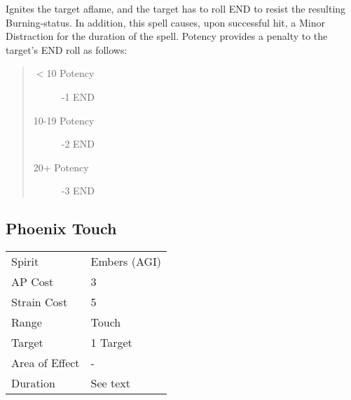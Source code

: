 \documentclass[11pt,a4paper,twocolumn]{book}
\begin{document}
Ignites the target aflame, and the target has to roll END to resist the resulting Burning-status. In addition, this spell causes, upon successful hit, a Minor Distraction for the duration of the spell. Potency provides a penalty to the target's END roll as follows:
\begin{quote}
	\begin{description}
		\item[$<$10 Potency] 	-1 END
		\item[10-19 Potency] 	-2 END
		\item[20+ Potency]  	-3 END
	\end{description}	
\end{quote}

%	



\subsection*{Phoenix Touch}
{
	\begin{tabu} to 75mm{| X[l,4] | X[l,7] |}
		\hline
		Spirit         & Embers (AGI) \\
		AP Cost        & 3            \\
		Strain Cost    & 5            \\
		Range          & Touch        \\
		Target         & 1 Target     \\
		Area of Effect & -            \\
		Duration       & See text     \\ \hline
	\end{tabu}
	
}
\end{document}
